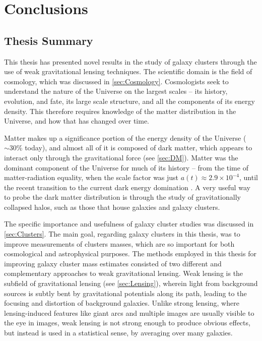 
\chapter{Conclusions}
\label{ch:conc}


\section{Thesis Summary}
\label{sec:summary}

This thesis has presented novel results in the study of galaxy clusters through the use of weak gravitational lensing techniques. The scientific domain is the field of cosmology, which was discussed in \autoref{sec:Cosmology}. Cosmologists seek to understand the nature of the Universe on the largest scales -- its history, evolution, and fate, its large scale structure, and all the components of its energy density. This therefore requires knowledge of the matter distribution in the Universe, and how that has changed over time. 

Matter makes up a significance portion of the energy density of the Universe ($\sim30$\% today), and almost all of it is composed of dark matter, which appears to interact only through the gravitational force (see \autoref{sec:DM}). Matter was the dominant component of the Universe for much of its history -- from the time of matter-radiation equality, when the scale factor was just $a(t) \approx 2.9 \times 10^{-4}$, until the recent transition to the current dark energy domination \citep{PlanckXIII_15}. A very useful way to probe the dark matter distribution is through the study of gravitationally collapsed halos, such as those that house galaxies and galaxy clusters.

The specific importance and usefulness of galaxy cluster studies was discussed in \autoref{sec:Clusters}. The main goal, regarding galaxy clusters in this thesis, was to improve measurements of clusters masses, which are so important for both cosmological and astrophysical purposes. The methods employed in this thesis for improving galaxy cluster mass estimates consisted of two different and complementary approaches to weak gravitational lensing. Weak lensing is the subfield of gravitational lensing (see \autoref{sec:Lensing}), wherein light from background sources is subtly bent by gravitational potentials along its path, leading to the focusing and distortion of background galaxies. Unlike strong lensing, where lensing-induced features like giant arcs and multiple images are usually visible to the eye in images, weak lensing is not strong enough to produce obvious effects, but instead is used in a statistical sense, by averaging over many galaxies.


